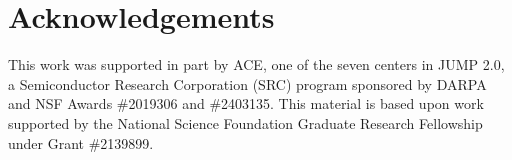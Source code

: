 \section{Acknowledgements}\label{sec:acknowledgements}
This work was supported in part by ACE, one of the seven centers in JUMP 2.0, a
Semiconductor Research Corporation (SRC) program sponsored by DARPA and NSF
Awards \#2019306 and \#2403135. This material is based upon work supported by
the National Science Foundation Graduate Research Fellowship under Grant
\#2139899.
